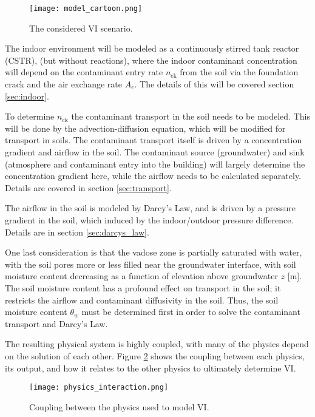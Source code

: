 \begin{figure}
  \texttt{[image: model\_cartoon.png]}
  \caption{The considered VI scenario.}
  \label{fig:vi_scenario}
\end{figure}

The indoor environment will be modeled as a continuously stirred tank reactor (CSTR), (but without reactions), where the indoor contaminant concentration will depend on the contaminant entry rate $n_\mathrm{ck}$ from the soil via the foundation crack and the air exchange rate $A_e$.
The details of this will be covered section \ref{sec:indoor}.\par

To determine $n_\mathrm{ck}$ the contaminant transport in the soil needs to be modeled.
This will be done by the advection-diffusion equation, which will be modified for transport in soils.
The contaminant transport itself is driven by a concentration gradient and airflow in the soil.
The contaminant source (groundwater) and sink (atmosphere and contaminant entry into the building) will largely determine the concentration gradient here, while the airflow needs to be calculated separately.
Details are covered in section \ref{sec:transport}.\par

The airflow in the soil is modeled by Darcy's Law, and is driven by a pressure gradient in the soil, which induced by the indoor/outdoor pressure difference.
Details are in section \ref{sec:darcys_law}.\par

One last consideration is that the vadose zone is partially saturated with water, with the soil pores more or less filled near the groundwater interface, with soil moisture content decreasing as a function of elevation above groundwater $z$ [\si{\metre}].
The soil moisture content has a profound effect on transport in the soil; it restricts the airflow and contaminant diffusivity in the soil.
Thus, the soil moisture content $\theta_w$ must be determined first in order to solve the contaminant transport and Darcy's Law.\par

The resulting physical system is highly coupled, with many of the physics depend on the solution of each other.
Figure \ref{fig:physics_overview} shows the coupling between each physics, its output, and how it relates to the other physics to ultimately determine VI.\par

\begin{figure}
  \texttt{[image: physics\_interaction.png]}
  \caption{Coupling between the physics used to model VI.}
  \label{fig:physics_overview}
\end{figure}

